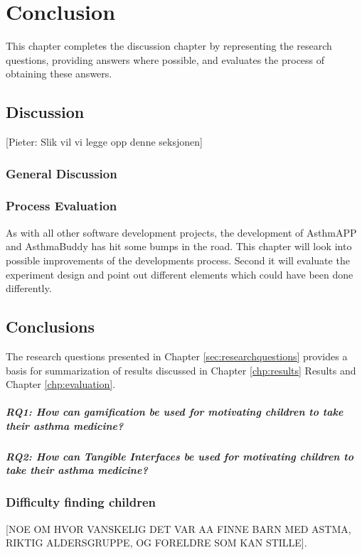 \chapter{Conclusion}
\label{chp:masterconclusion}

This chapter completes the discussion chapter by representing the research questions, providing answers where possible, and evaluates the process of obtaining these answers. 

\section{Discussion}
[Pieter: Slik vil vi legge opp denne seksjonen]

\subsection{General Discussion}


\subsection{Process Evaluation}
As with all other software development projects, the development of AsthmAPP and AsthmaBuddy has hit some bumps in the road. This chapter will look into possible improvements of the developments process. Second it will evaluate the experiment design and point out different elements which could have been done differently.

\section{Conclusions}

The research questions presented in Chapter \ref{sec:researchquestions} provides a basis for summarization of results discussed in Chapter \ref{chp:results} Results and Chapter \ref{chp:evaluation}. 

\paragraph{RQ1: How can gamification be used for motivating children to take their asthma medicine?}



\paragraph{RQ2: How can Tangible Interfaces be used for motivating children to take their asthma medicine?}





\subsection{Difficulty finding children}
[NOE OM HVOR VANSKELIG DET VAR AA FINNE BARN MED ASTMA, RIKTIG ALDERSGRUPPE, OG FORELDRE SOM KAN STILLE].  
